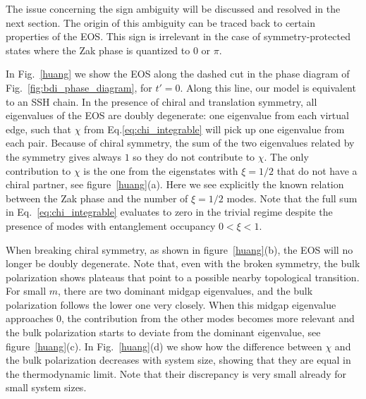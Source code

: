 \documentclass[twocolumn,amsmath,longbibliography,amssymb,superscriptaddress]{revtex4-1}
\begin{document}
The issue concerning the sign ambiguity will be discussed and resolved in the next section. 
The origin of this ambiguity can be traced back to certain properties of the EOS. This sign is irrelevant in the case of symmetry-protected states where the Zak phase is quantized to $0$ or $\pi$. 


In Fig.~\ref{huang} we show  the EOS along the dashed cut in the phase diagram of Fig.~\ref{fig:bdi_phase_diagram}, for $t'=0$. 
Along this line, our model is equivalent to an SSH chain. 
In the presence of chiral and translation symmetry, all eigenvalues of the EOS are doubly degenerate: one eigenvalue from each virtual edge, such that $\chi$ from Eq.\eqref{eq:chi_integrable} will pick up one eigenvalue from each pair. Because of chiral symmetry, the sum of the two eigenvalues related by the symmetry gives always $1$ so they do not contribute to $\chi$. The only contribution to $\chi$ is the one from the eigenstates with $\xi=1/2$ that do not have a chiral partner, see figure~\ref{huang}(a). Here we see explicitly the known relation between the Zak phase and the number of $\xi = 1/2$ modes.
Note that the full sum  in Eq.~\eqref{eq:chi_integrable}  evaluates to zero in the trivial regime despite the presence of modes with entanglement occupancy $0<\xi<1$. 

When breaking chiral symmetry, as shown in figure~\ref{huang}(b), the EOS will no longer be doubly degenerate. Note that, even with the broken symmetry, the bulk polarization shows plateaus that point to a possible nearby topological transition.
For small $m$, there are two dominant midgap eigenvalues, and the bulk polarization follows the lower one very closely.
When this midgap eigenvalue approaches  0, the contribution from the other modes becomes more relevant and the bulk polarization starts to deviate from the dominant eigenvalue, see figure~\ref{huang}(c). In Fig.~\ref{huang}(d) we show how the difference between $\chi$ and the bulk polarization decreases with system size, showing that they are equal in the thermodynamic limit. Note that their discrepancy is very small already for small system sizes. 
\end{document}
